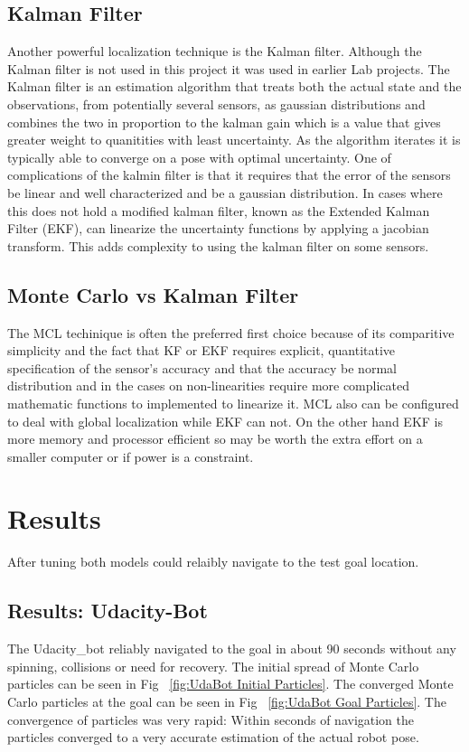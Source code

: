 \documentclass[10pt,journal,compsoc]{IEEEtran}
\begin{document}
\subsection{Kalman Filter}
Another powerful localization technique is the Kalman filter. Although the Kalman filter is not used in this project it was used in earlier Lab projects. The Kalman filter is an estimation algorithm that treats both the actual state and the observations, from potentially several sensors, as gaussian distributions and combines the two in proportion to the kalman gain which is a value that gives greater weight to quanitities with least uncertainty. As the algorithm iterates it is typically able to converge on a pose with optimal uncertainty.
One of complications of the kalmin filter is that it requires that the error of the sensors be linear and well characterized and be a gaussian distribution. In cases where this does not hold a modified kalman filter, known as the Extended Kalman Filter (EKF), can linearize the uncertainty functions by applying a jacobian transform. This adds complexity to using the kalman filter on some sensors.

\subsection{Monte Carlo vs Kalman Filter}
The MCL techinique is often the preferred first choice because of its comparitive simplicity and the fact that KF or EKF requires explicit, quantitative specification of the sensor's accuracy and that the accuracy be normal distribution and in the cases on non-linearities require more complicated mathematic functions to implemented to linearize it. MCL also can be configured to deal with global localization while EKF can not. On the other hand EKF is more memory and processor efficient so may be worth the extra effort on a smaller computer or if power is a constraint.

\section{Results}
After tuning both models could relaibly navigate to the test goal location.

\subsection{Results: Udacity-Bot}
The Udacity\_bot reliably navigated to the goal in about 90 seconds without any spinning, collisions or need for recovery. The initial spread of Monte Carlo particles can be seen in Fig ~\ref{fig:UdaBot Initial Particles}. The converged Monte Carlo particles at the goal can be seen in Fig ~\ref{fig:UdaBot Goal Particles}. The convergence of particles was very rapid: Within seconds of navigation the particles converged to a very accurate estimation of the actual robot pose.
\end{document}

